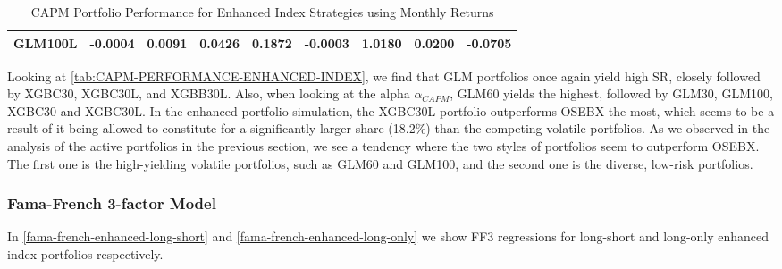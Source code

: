 \begin{table}[H]
\begin{tabularx}{\textwidth}{Xllllllll}
GLM100L &  -0.0004  & 0.0091 & 0.0426 & 0.1872 & -0.0003 & 1.0180 & 0.0200 & -0.0705 \\ 
\bottomrule
\end{tabularx}
\vspace{1em}
\caption{{CAPM Portfolio Performance for Enhanced Index Strategies using Monthly Returns}}
\label{tab:CAPM-PERFORMANCE-ENHANCED-INDEX}
\end{table}

Looking at \autoref{tab:CAPM-PERFORMANCE-ENHANCED-INDEX}, we find that GLM portfolios once again yield high SR, closely followed by XGBC30, XGBC30L, and XGBB30L. Also, when looking at the alpha $\alpha_{CAPM}$, GLM60 yields the highest, followed by GLM30, GLM100, XGBC30 and XGBC30L. In the enhanced portfolio simulation, the XGBC30L portfolio outperforms OSEBX the most, which seems to be a result of it being allowed to constitute for a significantly larger share (18.2\%) than the competing volatile portfolios. As we observed in the analysis of the active portfolios in the previous section, we see a tendency where the two styles of portfolios seem to outperform OSEBX. The first one is the high-yielding volatile portfolios, such as GLM60 and GLM100, and the second one is the diverse, low-risk portfolios.  

\subsubsection{Fama-French 3-factor Model}

In \autoref{fama-french-enhanced-long-short} and \autoref{fama-french-enhanced-long-only} we show FF3 regressions for long-short and long-only enhanced index portfolios respectively. 

